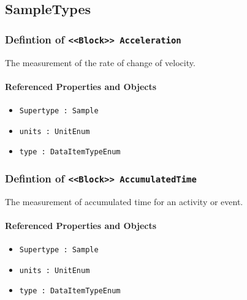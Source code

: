 \subsection{SampleTypes} \label{model:SampleTypes}
\subsubsection{Defintion of \texttt{<<Block>> Acceleration}}
  \label{type:Acceleration}

\FloatBarrier

The measurement of the rate of change of velocity.

\FloatBarrier
\paragraph{Referenced Properties and Objects}

\begin{itemize}
\item \texttt{Supertype : Sample}

\item \texttt{units : UnitEnum}

\item \texttt{type : DataItemTypeEnum}

\end{itemize}
\FloatBarrier
\subsubsection{Defintion of \texttt{<<Block>> AccumulatedTime}}
  \label{type:AccumulatedTime}

\FloatBarrier

The measurement of accumulated time for an activity or event.

\FloatBarrier
\paragraph{Referenced Properties and Objects}

\begin{itemize}
\item \texttt{Supertype : Sample}

\item \texttt{units : UnitEnum}

\item \texttt{type : DataItemTypeEnum}

\end{itemize}
\FloatBarrier
